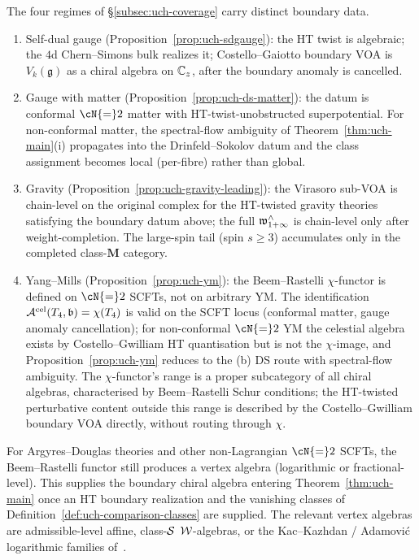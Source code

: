 \begin{remark}
\label{rem:uch-coverage-scope}
The four regimes of \S\ref{subsec:uch-coverage} carry distinct
boundary data.
\begin{enumerate}[label=\textup{(\alph*)}]
\item Self-dual gauge (Proposition~\ref{prop:uch-sdgauge}):
the HT twist is algebraic; the $4$d Chern--Simons bulk realizes it;
Costello--Gaiotto boundary VOA is $V_k(\mathfrak g)$ as a chiral
algebra on $\mathbb C_z$, after the boundary anomaly is cancelled.
\item Gauge with matter (Proposition~\ref{prop:uch-ds-matter}):
the datum is conformal $\cN{=}2$ matter with HT-twist-unobstructed
superpotential. For non-conformal matter, the spectral-flow ambiguity
of Theorem~\ref{thm:uch-main}(i) propagates into the
Drinfeld--Sokolov datum and the class assignment becomes local
(per-fibre) rather than global.
\item Gravity (Proposition~\ref{prop:uch-gravity-leading}):
the Virasoro sub-VOA is chain-level on the original complex for the
HT-twisted gravity theories satisfying the boundary datum above; the
full $\mathfrak w_{1+\infty}^{\wedge}$ is chain-level only after weight-completion. The
large-spin tail (spin $s \ge 3$) accumulates only in the completed
class-$\mathbf M$ category.
\item Yang--Mills (Proposition~\ref{prop:uch-ym}):
the Beem--Rastelli $\chi$-functor is defined on $\cN{=}2$ SCFTs, not
on arbitrary YM. The identification
$\mathcal A^{\mathrm{cel}}(T_4,\mathfrak b) = \chi(T_4)$ is valid on the
SCFT locus (conformal matter, gauge anomaly cancellation); for
non-conformal $\cN{=}2$ YM the celestial algebra
exists by Costello--Gwilliam HT quantisation but is not the
$\chi$-image, and Proposition~\ref{prop:uch-ym} reduces to the
(b) DS route with spectral-flow ambiguity. The $\chi$-functor's
range is a proper subcategory of all chiral algebras, characterised
by Beem--Rastelli Schur conditions; the HT-twisted perturbative
content outside this range is described by the
Costello--Gwilliam boundary VOA directly, without routing through
$\chi$.
\end{enumerate}
\end{remark}

\begin{remark}
\label{rem:uch-nonlagrangian}
For Argyres--Douglas theories and other non-Lagrangian $\cN{=}2$
SCFTs, the Beem--Rastelli functor still produces a vertex algebra
(logarithmic or fractional-level). This supplies the boundary chiral
algebra entering Theorem~\ref{thm:uch-main} once an HT boundary
realization and the vanishing classes of
Definition~\ref{def:uch-comparison-classes} are supplied. The relevant
vertex algebras are admissible-level affine, class-$\mathcal S$ $\mathcal W$-algebras, or the
Kac--Kazhdan / Adamovi\'c logarithmic families of~\cite{ACK24, ACK24b,
Adamovic03}.
\end{remark}

